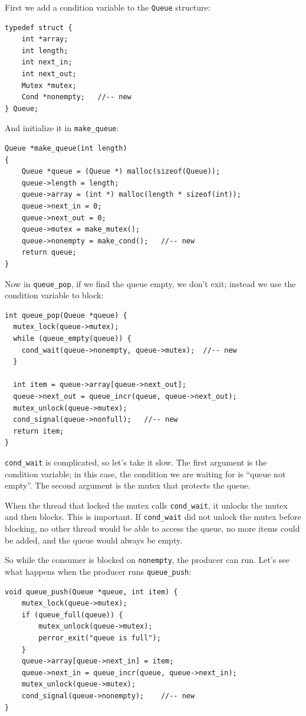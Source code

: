 \documentclass[12pt]{book}
\begin{document}
{First we add a condition variable to the {\tt Queue} structure:

\begin{verbatim}
typedef struct {
    int *array;
    int length;
    int next_in;
    int next_out;
    Mutex *mutex;
    Cond *nonempty;   //-- new
} Queue;
\end{verbatim}

And initialize it in \verb"make_queue":

\begin{verbatim}
Queue *make_queue(int length)
{
    Queue *queue = (Queue *) malloc(sizeof(Queue));
    queue->length = length;
    queue->array = (int *) malloc(length * sizeof(int));
    queue->next_in = 0;
    queue->next_out = 0;
    queue->mutex = make_mutex();
    queue->nonempty = make_cond();   //-- new
    return queue;
}
\end{verbatim}

Now in \verb"queue_pop", if we find the queue empty, we don't
exit; instead we use the condition variable to block:

\begin{verbatim}
int queue_pop(Queue *queue) {
  mutex_lock(queue->mutex);
  while (queue_empty(queue)) {
    cond_wait(queue->nonempty, queue->mutex);  //-- new
  }
  
  int item = queue->array[queue->next_out];
  queue->next_out = queue_incr(queue, queue->next_out);
  mutex_unlock(queue->mutex);
  cond_signal(queue->nonfull);   //-- new
  return item;
}
\end{verbatim}

\verb"cond_wait" is complicated, so let's take it slow.  
The first argument is the condition variable; in this case,
the condition we are waiting for is ``queue not empty''.  The second
argument is the mutex that protects the queue.

When the thread that locked the mutex calls \verb"cond_wait", it
unlocks the mutex and then blocks.  This is important.  If
\verb"cond_wait" did not unlock the mutex before blocking, no
other thread would be able to access the queue, no more items
could be added, and the queue would always be empty.

So while the consumer is blocked on {\tt nonempty}, the producer can
run.  Let's see what happens when the producer runs \verb"queue_push":

\begin{verbatim}
void queue_push(Queue *queue, int item) {
    mutex_lock(queue->mutex);
    if (queue_full(queue)) {
        mutex_unlock(queue->mutex);
        perror_exit("queue is full");
    }
    queue->array[queue->next_in] = item;
    queue->next_in = queue_incr(queue, queue->next_in);
    mutex_unlock(queue->mutex);
    cond_signal(queue->nonempty);    //-- new
}
\end{verbatim}

}
\end{document}
